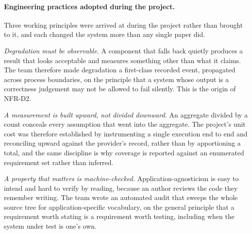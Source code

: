 \paragraph{Engineering practices adopted during the project.} Three working
principles were arrived at during the project rather than brought to it, and
each changed the system more than any single paper did.

\emph{Degradation must be observable.} A component that falls back quietly
produces a result that looks acceptable and measures something other than what
it claims. The team therefore made degradation a first-class recorded event,
propagated across process boundaries, on the principle that a system whose
output is a correctness judgement may not be allowed to fail silently. This is
the origin of NFR-D2.

\emph{A measurement is built upward, not divided downward.} An aggregate divided
by a count conceals every assumption that went into the aggregate. The project's
unit cost was therefore established by instrumenting a single execution end to
end and reconciling upward against the provider's record, rather than by
apportioning a total, and the same discipline is why coverage is reported
against an enumerated requirement set rather than inferred.

\emph{A property that matters is machine-checked.} Application-agnosticism is
easy to intend and hard to verify by reading, because an author reviews the code
they remember writing. The team wrote an automated audit that sweeps the whole
source tree for application-specific vocabulary, on the general principle that a
requirement worth stating is a requirement worth testing, including when the
system under test is one's own.
